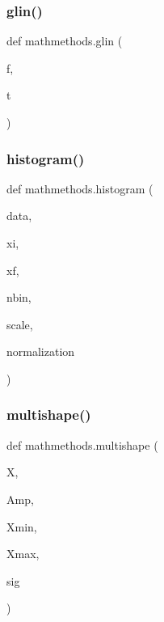 \mbox{\label{namespacemathmethods_a0fb68fc053fd07ac6147303e63e078dd}} 
\subsubsection{\texorpdfstring{glin()}{glin()}}
{\footnotesize\ttfamily def mathmethods.\+glin (\begin{DoxyParamCaption}\item[{}]{f,  }\item[{}]{t }\end{DoxyParamCaption})}

\mbox{\label{namespacemathmethods_a65d2eaef2e9376f85d580ee0e9a841c6}} 
\subsubsection{\texorpdfstring{histogram()}{histogram()}}
{\footnotesize\ttfamily def mathmethods.\+histogram (\begin{DoxyParamCaption}\item[{}]{data,  }\item[{}]{xi,  }\item[{}]{xf,  }\item[{}]{nbin,  }\item[{}]{scale,  }\item[{}]{normalization }\end{DoxyParamCaption})}

\mbox{\label{namespacemathmethods_a807d5769839d9d7ad1c03740e39085dd}} 
\subsubsection{\texorpdfstring{multishape()}{multishape()}}
{\footnotesize\ttfamily def mathmethods.\+multishape (\begin{DoxyParamCaption}\item[{}]{X,  }\item[{}]{Amp,  }\item[{}]{Xmin,  }\item[{}]{Xmax,  }\item[{}]{sig }\end{DoxyParamCaption})}


